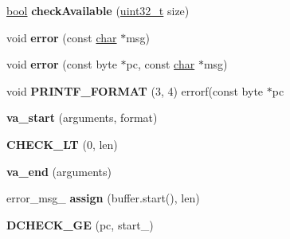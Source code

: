 \begin{DoxyCompactItemize}
\item 
\mbox{\label{classv8_1_1internal_1_1wasm_1_1Decoder_a8cec95f027b2f39072eef25eb1a04213}} 
\mbox{\hyperlink{classbool}{bool}} {\bfseries check\+Available} (\mbox{\hyperlink{classuint32__t}{uint32\+\_\+t}} size)
\item 
\mbox{\label{classv8_1_1internal_1_1wasm_1_1Decoder_a8de1515317bff5dc875a702f2007e13f}} 
void {\bfseries error} (const \mbox{\hyperlink{classchar}{char}} $\ast$msg)
\item 
\mbox{\label{classv8_1_1internal_1_1wasm_1_1Decoder_ada714b098cf1976c6634b90622a420fe}} 
void {\bfseries error} (const byte $\ast$pc, const \mbox{\hyperlink{classchar}{char}} $\ast$msg)
\item 
\mbox{\label{classv8_1_1internal_1_1wasm_1_1Decoder_a068237a704dbf479746c32117c1f4d2d}} 
void {\bfseries P\+R\+I\+N\+T\+F\+\_\+\+F\+O\+R\+M\+AT} (3, 4) errorf(const byte $\ast$pc
\item 
\mbox{\label{classv8_1_1internal_1_1wasm_1_1Decoder_aff2381888a884ba3f517f69de31911ee}} 
{\bfseries va\+\_\+start} (arguments, format)
\item 
\mbox{\label{classv8_1_1internal_1_1wasm_1_1Decoder_ad8826cd1232bda58d3482f42476fb210}} 
{\bfseries C\+H\+E\+C\+K\+\_\+\+LT} (0, len)
\item 
\mbox{\label{classv8_1_1internal_1_1wasm_1_1Decoder_a1dbacf6656f1b90c92b784e8bcd6667d}} 
{\bfseries va\+\_\+end} (arguments)
\item 
\mbox{\label{classv8_1_1internal_1_1wasm_1_1Decoder_ae9aa9087bb8355a85d7a1c8cab2274bd}} 
error\+\_\+msg\+\_\+ {\bfseries assign} (buffer.\+start(), len)
\item 
\mbox{\label{classv8_1_1internal_1_1wasm_1_1Decoder_a6ac3f04318b19dfdb3c1f003d07bc597}} 
{\bfseries D\+C\+H\+E\+C\+K\+\_\+\+GE} (pc, start\+\_\+)

\end{DoxyCompactItemize}
